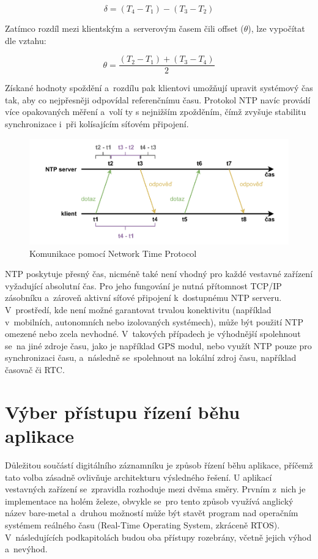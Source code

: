 \[
    \delta = (T_4 - T_1) - (T_3 - T_2)
\]

    

Zatímco rozdíl mezi klientským a~serverovým časem čili offset ($\theta$), lze vypočítat dle vztahu:

\[
    \theta = \frac{(T_2 - T_1) + (T_3 - T_4)}{2}
\]

Získané hodnoty spoždění a~rozdílu pak klientovi umožňují upravit systémový čas tak, aby co nejpřesněji odpovídal referenčnímu času. Protokol NTP navíc provádí více opakovaných měření a~volí ty s nejnižším zpožděním, čímž zvyšuje stabilitu synchronizace i~při kolísajícím síťovém připojení.~\cite{sookocheff_ntp}

\begin{figure}[h]
    \centering
    \includegraphics[width=1.00\textwidth]{obrazky-figures/network_time_protocol.pdf}
    
    \caption{Komunikace pomocí Network Time Protocol~\cite{sookocheff_ntp}}
    \label{fig:network-time-protocol}
\end{figure}

NTP poskytuje přesný čas, nicméně také není vhodný pro každé vestavné zařízení vyžadující absolutní čas. Pro jeho fungování je nutná přítomnost TCP/IP zásobníku a~zároveň aktivní síťové připojení k~dostupnému NTP serveru. V~prostředí, kde není možné garantovat trvalou konektivitu (například v~mobilních, autonomních nebo izolovaných systémech), může být použití NTP omezené nebo zcela nevhodné. V~takových případech je výhodnější spolehnout se~na jiné zdroje času, jako je například GPS modul, nebo využít NTP pouze pro synchronizaci času, a~následně se~spolehnout na lokální zdroj času, například časovač či RTC.

\section{Výber přístupu řízení běhu aplikace}
Důležitou součástí digitálního záznamníku je způsob řízení běhu aplikace, příčemž tato volba zásadně ovlivňuje architekturu výsledného řešení. U aplikací vestavných zařízení se~zpravidla rozhoduje mezi dvěma směry. Prvním z~nich je implementace na holém železe, obvykle se~pro tento způsob využívá anglický název bare-metal a~druhou možností může být stavět program nad operačním systémem reálného času (Real-Time Operating System, zkráceně RTOS). V~následujících podkapitolách budou oba přístupy rozebrány, včetně jejich výhod a~nevýhod. 

